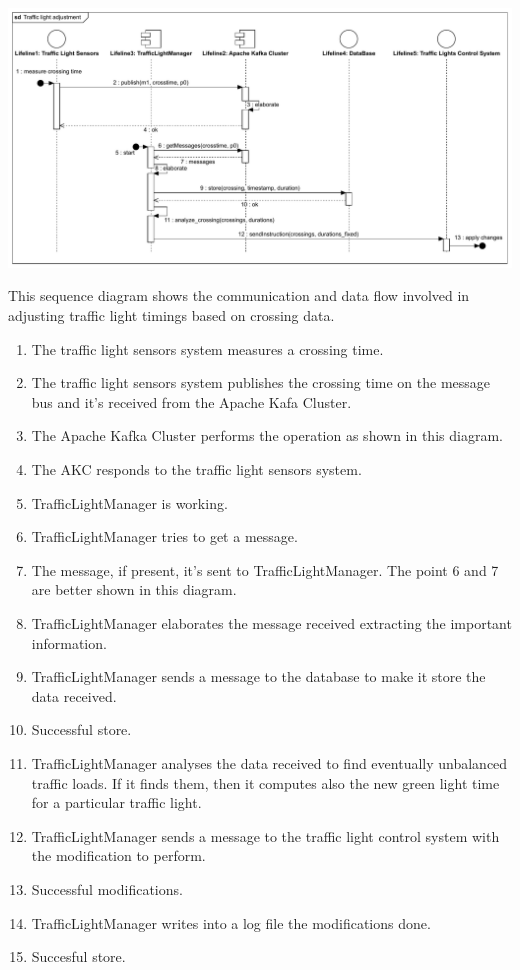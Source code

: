 \documentclass[12pt, a4paper, twoside, openright]{report}
\begin{document}
\includegraphics[width=\linewidth]{images/svg/traffic_light_adjustment.pdf}

This sequence diagram shows the communication and data flow involved in
adjusting traffic light timings based on crossing data.

\begin{enumerate}
\item
  The traffic light sensors system measures a crossing time.
\item
  The traffic light sensors system publishes the crossing time on the
  message bus and it's received from the Apache Kafa Cluster.
\item
  The Apache Kafka Cluster performs the operation as shown in this
  diagram.
\item
  The AKC responds to the traffic light sensors system.
\item
  TrafficLightManager is working.
\item
  TrafficLightManager tries to get a message.
\item
  The message, if present, it's sent to TrafficLightManager. The point 6
  and 7 are better shown in this diagram.
\item
  TrafficLightManager elaborates the message received extracting the
  important information.
\item
  TrafficLightManager sends a message to the database to make it store
  the data received.
\item
  Successful store.
\item
  TrafficLightManager analyses the data received to find eventually
  unbalanced traffic loads. If it finds them, then it computes also the
  new green light time for a particular traffic light.
\item
  TrafficLightManager sends a message to the traffic light control
  system with the modification to perform.
\item
  Successful modifications.
\item
  TrafficLightManager writes into a log file the modifications done.
\item
  Succesful store.
\end{enumerate}
\end{document}
